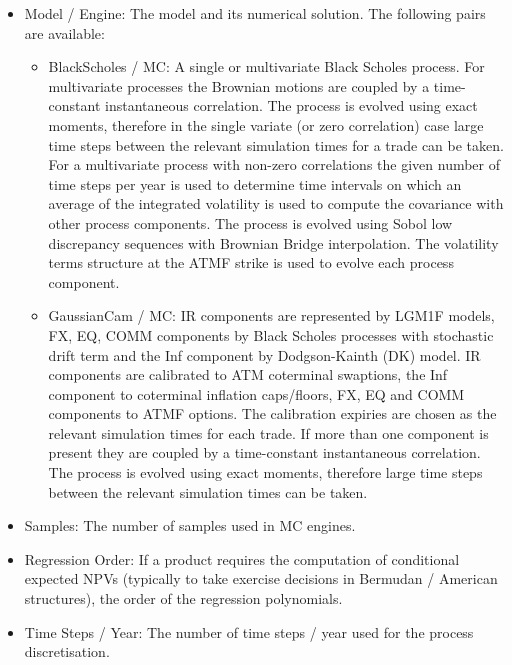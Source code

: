 \begin{itemize}
\item Model / Engine: The model and its numerical solution. The following pairs are available:
  \begin{itemize}
  \item BlackScholes / MC: A single or multivariate Black Scholes process. For multivariate processes the Brownian
    motions are coupled by a time-constant instantaneous correlation. The process is evolved using exact moments,
    therefore in the single variate (or zero correlation) case large time steps between the relevant simulation times
    for a trade can be taken. For a multivariate process with non-zero correlations the given number of time steps per
    year is used to determine time intervals on which an average of the integrated volatility is used to compute the
    covariance with other process components. The process is evolved using Sobol low discrepancy sequences with Brownian
    Bridge interpolation. The volatility terms structure at the ATMF strike is used to evolve each process component.
  \item GaussianCam / MC: IR components are represented by LGM1F models, FX, EQ, COMM components by Black Scholes
    processes with stochastic drift term and the Inf component by Dodgson-Kainth (DK) model. IR components are calibrated 
    to ATM coterminal swaptions, the Inf component to coterminal inflation caps/floors, FX, EQ and COMM
    components to ATMF options. The calibration expiries are chosen as the relevant simulation times for each trade. If
    more than one component is present they are coupled by a time-constant instantaneous correlation. The process is
    evolved using exact moments, therefore large time steps between the relevant simulation times can be taken.
  \end{itemize}
  \item Samples: The number of samples used in MC engines.
  \item Regression Order: If a product requires the computation of conditional expected NPVs (typically to take exercise
    decisions in Bermudan / American structures), the order of the regression polynomials.
  \item Time Steps / Year: The number of time steps / year used for the process discretisation.
\end{itemize}

